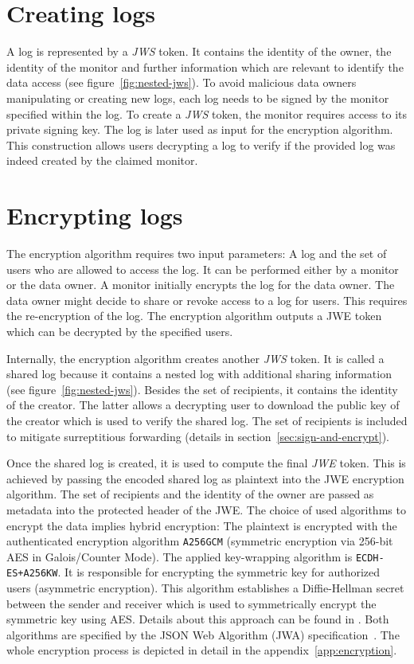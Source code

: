 \documentclass[../main.tex]{subfiles}
\begin{document}
\section{Creating logs}
\label{sec:signing}
A log is represented by a \textit{JWS} token.
It contains the identity of the owner, the identity of the monitor and further information which are relevant to identify the data access (see figure~\ref{fig:nested-jws}).
To avoid malicious data owners manipulating or creating new logs, each log needs to be signed by the monitor specified within the log.
To create a \textit{JWS} token, the monitor requires access to its private signing key.
The log is later used as input for the encryption algorithm.
This construction allows users decrypting a log to verify if the provided log was indeed created by the claimed monitor.

\section{Encrypting logs}\label{sec:encrypting}

The encryption algorithm requires two input parameters: A log and the set of users who are allowed to access the log.
It can be performed either by a monitor or the data owner.
A monitor initially encrypts the log for the data owner.
The data owner might decide to share or revoke access to a log for users.
This requires the re-encryption of the log.
The encryption algorithm outputs a JWE token which can be decrypted by the specified users.

Internally, the encryption algorithm creates another \textit{JWS} token.
It is called a shared log because it contains a nested log with additional sharing information (see figure~\ref{fig:nested-jws}).
Besides the set of recipients, it contains the identity of the creator.
The latter allows a decrypting user to download the public key of the creator which is used to verify the shared log.
The set of recipients is included to mitigate surreptitious forwarding (details in section~\ref{sec:sign-and-encrypt}).

Once the  shared log is created, it is used to compute the final \textit{JWE} token.
This is achieved by passing the encoded shared log as plaintext into the JWE encryption algorithm.
The set of recipients and the identity of the owner are passed as metadata into the protected header of the JWE.
The choice of used algorithms to encrypt the data implies hybrid encryption:
The plaintext is encrypted with the authenticated encryption algorithm \verb|A256GCM| (symmetric encryption via 256-bit AES in Galois/Counter Mode).
The applied key-wrapping algorithm is \verb|ECDH-ES+A256KW|.
It is responsible for encrypting the symmetric key for authorized users (asymmetric encryption).
This algorithm establishes a Diffie-Hellman secret between the sender and receiver which is used to symmetrically encrypt the symmetric key using AES.
Details about this approach can be found in \cite[100]{Barker2017}.
Both algorithms are specified by the JSON Web Algorithm (JWA) specification~\cite{Jones2015}.
The whole encryption process is depicted in detail in the appendix~\ref{app:encryption}.
\end{document}
